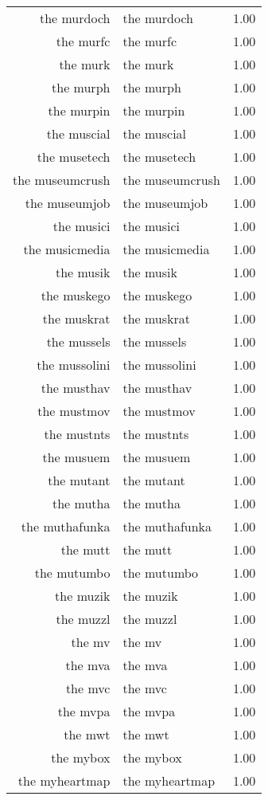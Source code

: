 \begin{table}[ht]
\begin{tabular}{rlr}
  the murdoch & the murdoch & 1.00 \\ 
  the murfc & the murfc & 1.00 \\ 
  the murk & the murk & 1.00 \\ 
  the murph & the murph & 1.00 \\ 
  the murpin & the murpin & 1.00 \\ 
  the muscial & the muscial & 1.00 \\ 
  the musetech & the musetech & 1.00 \\ 
  the museumcrush & the museumcrush & 1.00 \\ 
  the museumjob & the museumjob & 1.00 \\ 
  the musici & the musici & 1.00 \\ 
  the musicmedia & the musicmedia & 1.00 \\ 
  the musik & the musik & 1.00 \\ 
  the muskego & the muskego & 1.00 \\ 
  the muskrat & the muskrat & 1.00 \\ 
  the mussels & the mussels & 1.00 \\ 
  the mussolini & the mussolini & 1.00 \\ 
  the musthav & the musthav & 1.00 \\ 
  the mustmov & the mustmov & 1.00 \\ 
  the mustnts & the mustnts & 1.00 \\ 
  the musuem & the musuem & 1.00 \\ 
  the mutant & the mutant & 1.00 \\ 
  the mutha & the mutha & 1.00 \\ 
  the muthafunka & the muthafunka & 1.00 \\ 
  the mutt & the mutt & 1.00 \\ 
  the mutumbo & the mutumbo & 1.00 \\ 
  the muzik & the muzik & 1.00 \\ 
  the muzzl & the muzzl & 1.00 \\ 
  the mv & the mv & 1.00 \\ 
  the mva & the mva & 1.00 \\ 
  the mvc & the mvc & 1.00 \\ 
  the mvpa & the mvpa & 1.00 \\ 
  the mwt & the mwt & 1.00 \\ 
  the mybox & the mybox & 1.00 \\ 
  the myheartmap & the myheartmap & 1.00 \\ 

\end{tabular}
\end{table}

